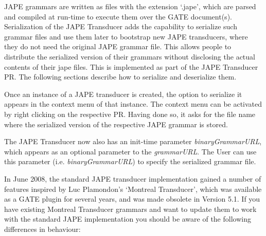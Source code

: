 
JAPE grammars are written as files with the extension `.jape', which
are parsed and compiled at run-time to execute them over the GATE
document(s). Serialization of the JAPE Transducer adds the capability
to serialize such grammar files and use them later to bootstrap new
JAPE transducers, where they do not need the original JAPE grammar
file. This allows people to distribute the serialized version of their
grammars without disclosing the actual contents of their jape
files. This is implemented as part of the JAPE Transducer PR. The
following sections describe how to serialize and deserialize them.


Once an instance of a JAPE transducer is created, the option to
serialize it appears in the context menu of that instance. The context
menu can be activated by right clicking on the respective PR. Having
done so, it asks for the file name where the serialized version of the
respective JAPE grammar is stored.


The JAPE Transducer now also has an init-time
parameter \textit{binaryGrammarURL}, which appears as an optional
parameter to the \textit{grammarURL}. The User can use this parameter
(i.e. \textit{binaryGrammarURL}) to specify the serialized grammar
file.


In June 2008, the standard JAPE transducer implementation gained a number of
features inspired by Luc Plamondon's `Montreal Transducer', which was available
as a GATE plugin for several years, and was made obsolete in Version 5.1. If you
have existing Montreal Transducer grammars and want to update them to work with
the standard JAPE implementation you should be aware of the following differences
in behaviour:

